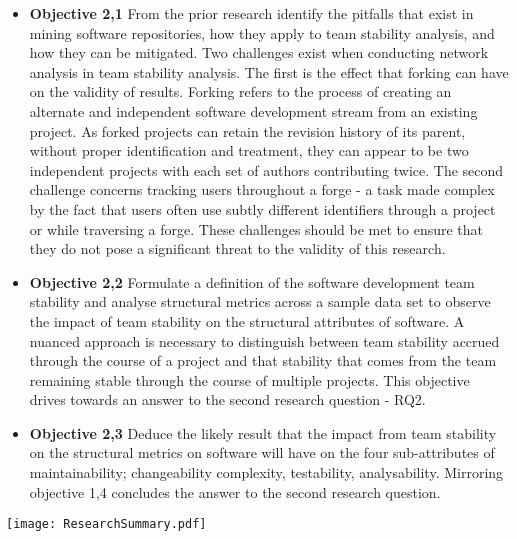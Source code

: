 \begin{itemize}
\begin{itemize}
\item \textbf{Objective 2,1} From the prior research identify the pitfalls that exist in mining software repositories, how they apply to team stability analysis, and how they can be mitigated. Two challenges exist when conducting network analysis in team stability analysis. The first is the effect that forking can have on the validity of results. Forking refers to the process of creating an alternate and independent software development stream from an existing project. As forked projects can retain the revision history of its parent, without proper identification and treatment, they can appear to be two independent projects with each set of authors contributing twice. The second challenge concerns tracking users throughout a forge - a task made complex by the fact that users often use subtly different identifiers through a project or while traversing a forge. These challenges should be met to ensure that they do not pose a significant threat to the validity of this research.
\item \textbf{Objective 2,2} Formulate a definition of the software development team stability and analyse structural metrics across a sample data set to observe the impact of team stability on the structural attributes of software. A nuanced approach is necessary to distinguish between team stability accrued through the course of a project and that stability that comes from the team remaining stable through the course of multiple projects. This objective drives towards an answer to the second research question - RQ2.
\item \textbf{Objective 2,3} Deduce the likely result that the impact from team stability on the structural metrics on software will have on the four sub-attributes of maintainability; changeability complexity, testability, analysability. Mirroring objective 1,4 concludes the answer to the second research question.
\end{itemize}
\end{itemize}

\begin{table}
\begin{tabular}
 \centering 
 \texttt{[image: ResearchSummary.pdf]}
 \label{tab:researchSummary}
\end{tabular}
\end{table}

